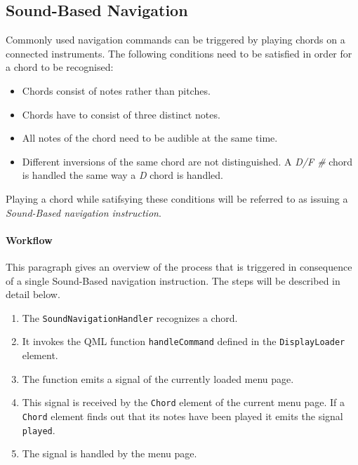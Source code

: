 \subsection{Sound-Based Navigation}
\label{sec:sound based navigation}
Commonly used navigation commands can be triggered by playing chords on a connected instruments. The following conditions need to be satisfied in order for a chord to be recognised:
\begin {itemize}
	\item {Chords consist of notes rather than pitches.}
	\item {Chords have to consist of three distinct notes.}
	\item {All notes of the chord need to be audible at the same time.}
	\item {Different inversions of the same chord are not distinguished. A \textit{D/F \#} chord is handled the same way a \textit{D} chord is handled.}
\end{itemize}
Playing a chord  while satifsying these conditions will be referred to as issuing a \textit{Sound-Based navigation instruction}.
\paragraph{Workflow}
This paragraph gives an overview of the process that is triggered in consequence of a single Sound-Based navigation instruction. The steps will be described in detail below.
\begin {enumerate}
	\item {The {\tt SoundNavigationHandler} recognizes a chord.}
	\item {It invokes the QML function {\tt handleCommand} defined in the {\tt DisplayLoader} element.}
	\item {The function emits a signal of the currently loaded menu page.}
	\item {This signal is received by the {\tt Chord} element of the current menu page. If a {\tt Chord} element finds out that its notes have been played it emits the signal {\tt played}.}
	\item {The signal is handled by the menu page.}
\end {enumerate}
